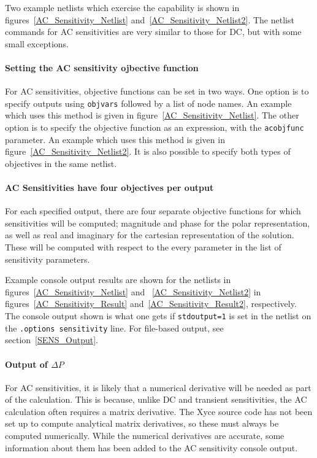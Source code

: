 Two example netlists which exercise the
capability is shown in figures~\ref{AC_Sensitivity_Netlist} 
and~\ref{AC_Sensitivity_Netlist2}.
The netlist commands for AC sensitivities are very similar to those
for DC, but with some small exceptions.   

\paragraph{Setting the AC sensitivity ojbective function}
For AC sensitivities, objective functions can be set in two ways.  One option is to 
specify outputs using \texttt{objvars} followed by a list of node names.      
An example which  uses this method is given in figure~\ref{AC_Sensitivity_Netlist}.  
The other option is to specify the objective function as an expression, with 
the \texttt{acobjfunc} parameter.  
An example which  uses this method is given in figure~\ref{AC_Sensitivity_Netlist2}.  
It is also possible to specify both types of objectives in the same netlist.

\paragraph{AC Sensitivities have four objectives per output}
For each specified output, there are four separate objective functions
for which sensitivities will be computed; magnitude and phase for the
polar representation, as well as real and imaginary for the cartesian
representation of the solution.   These will be computed with respect to 
the every parameter in the list of sensitivity parameters.   

Example console output results are shown for the netlists in figures~\ref{AC_Sensitivity_Netlist} 
and ~\ref{AC_Sensitivity_Netlist2} in figures~\ref{AC_Sensitivity_Result} 
and~\ref{AC_Sensitivity_Result2}, respectively.  The console output shown is what one gets 
if \texttt{stdoutput=1} is set in the netlist on the \texttt{.options sensitivity} line.
For file-based output, see section~\ref{SENS_Output}.  

\paragraph{Output of $\Delta P$}
For AC sensitivities, it is likely that a numerical derivative will be needed
as part of the calculation.  This is because, unlike DC and transient 
sensitivities, the AC calculation often requires a matrix derivative.  
The Xyce source code has not been set up to compute analytical matrix 
derivatives, so these must always be computed numerically.
While the numerical derivatives are accurate, some information about 
them has been added to the AC sensitivity console output.

